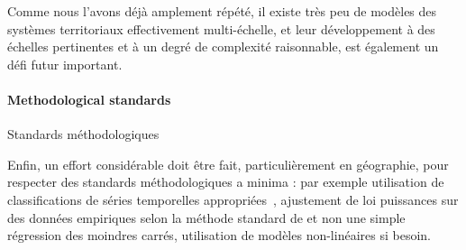 
Comme nous l'avons déjà amplement répété, il existe très peu de modèles des systèmes territoriaux effectivement multi-échelle, et leur développement à des échelles pertinentes et à un degré de complexité raisonnable, est également un défi futur important.



\paragraph{Methodological standards}{Standards méthodologiques}


Enfin, un effort considérable doit être fait, particulièrement en géographie, pour respecter des standards méthodologiques a minima : par exemple utilisation de classifications de séries temporelles appropriées~\cite{liao2005clustering}, ajustement de loi puissances sur des données empiriques selon la méthode standard de \cite{clauset2009power} et non une simple régression des moindres carrés, utilisation de modèles non-linéaires si besoin.







%




\stars




